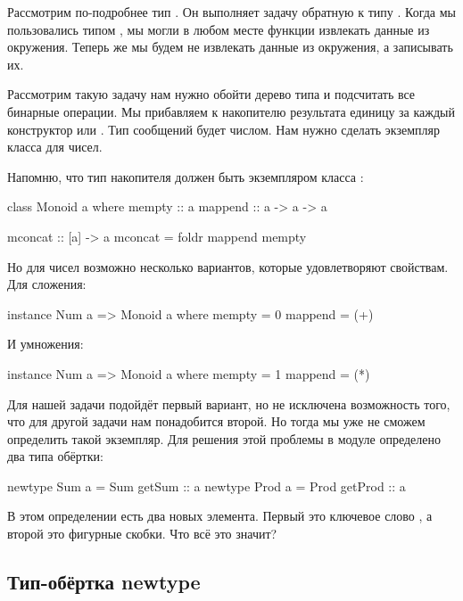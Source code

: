 Рассмотрим по-подробнее тип . Он выполняет
задачу обратную к типу . Когда мы пользовались
типом , мы могли в любом месте функции извлекать
данные из окружения. Теперь же мы будем не извлекать данные
из окружения, а записывать их. 

Рассмотрим такую задачу нам нужно обойти дерево типа 
и подсчитать все бинарные операции. Мы прибавляем к накопителю
результата единицу за каждый конструктор  или .
Тип сообщений будет числом. Нам нужно сделать
экземпляр класса  для чисел. 

Напомню, что тип накопителя должен быть экземпляром класса
:

\begin{code}
class Monoid a where
    mempty  :: a
    mappend :: a -> a -> a

    mconcat :: [a] -> a
    mconcat = foldr mappend mempty
\end{code}


Но для чисел возможно несколько вариантов, которые удовлетворяют
свойствам. Для сложения:

\begin{code}
instance Num a => Monoid a where
    mempty  = 0
    mappend = (+)
\end{code}

И умножения:

\begin{code}
instance Num a => Monoid a where
    mempty  = 1
    mappend = (*)
\end{code}

Для нашей задачи подойдёт первый вариант, но не
исключена возможность того, что для другой задачи
нам понадобится второй. Но тогда мы уже не сможем
определить такой экземпляр. Для решения этой проблемы
в модуле  определено два типа обёртки:

\begin{code}
newtype Sum  a = Sum  { getSum  :: a }
newtype Prod a = Prod { getProd :: a }
\end{code}

В этом определении есть два новых элемента.
Первый это ключевое слово  , а второй
это фигурные скобки. Что всё это значит?


\subsection{Тип-обёртка newtype}

